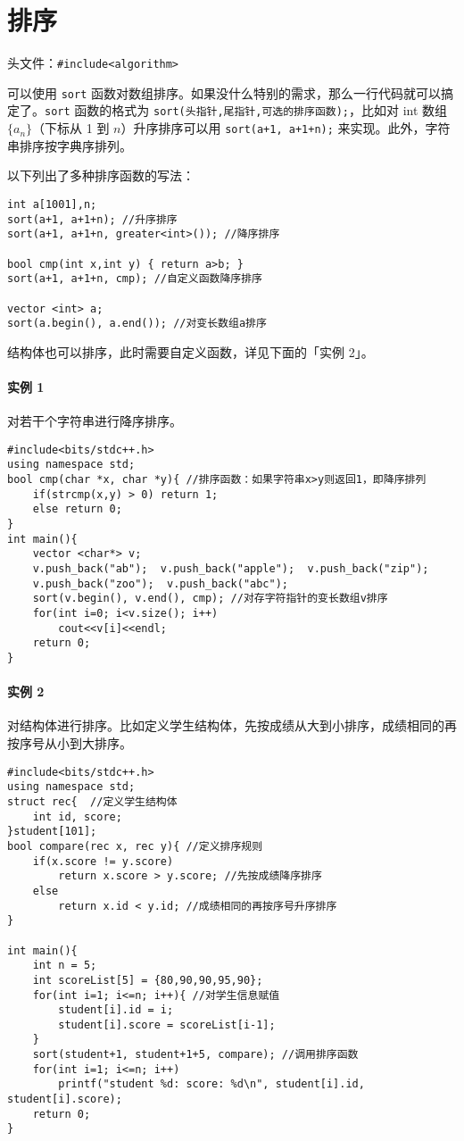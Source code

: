 \documentclass[UTF8]{ctexart}
\begin{document}
\section{排序}
头文件：\verb!#include<algorithm>!

可以使用 \verb!sort! 函数对数组排序。如果没什么特别的需求，那么一行代码就可以搞定了。\verb!sort! 函数的格式为 \verb!sort(头指针,尾指针,可选的排序函数);!，比如对 int 数组 $\{a_n\}$（下标从 1 到 $n$）升序排序可以用 \verb!sort(a+1, a+1+n);! 来实现。此外，字符串排序按字典序排列。

以下列出了多种排序函数的写法：
\begin{lstlisting}[numbers=none]
int a[1001],n;
sort(a+1, a+1+n); //升序排序
sort(a+1, a+1+n, greater<int>()); //降序排序

bool cmp(int x,int y) { return a>b; }
sort(a+1, a+1+n, cmp); //自定义函数降序排序

vector <int> a;
sort(a.begin(), a.end()); //对变长数组a排序
\end{lstlisting}

结构体也可以排序，此时需要自定义函数，详见下面的「实例 2」。

\paragraph{实例 1} 对若干个字符串进行降序排序。
\begin{lstlisting}
#include<bits/stdc++.h>
using namespace std;
bool cmp(char *x, char *y){ //排序函数：如果字符串x>y则返回1，即降序排列
	if(strcmp(x,y) > 0) return 1;
	else return 0;
}
int main(){
	vector <char*> v;
	v.push_back("ab");  v.push_back("apple");  v.push_back("zip");
	v.push_back("zoo");  v.push_back("abc");
	sort(v.begin(), v.end(), cmp); //对存字符指针的变长数组v排序
	for(int i=0; i<v.size(); i++)
		cout<<v[i]<<endl;
	return 0;
}
\end{lstlisting}

\BgThispage
\paragraph{实例 2} 对结构体进行排序。比如定义学生结构体，先按成绩从大到小排序，成绩相同的再按序号从小到大排序。
\begin{lstlisting}
#include<bits/stdc++.h>
using namespace std;
struct rec{  //定义学生结构体
    int id, score;
}student[101];
bool compare(rec x, rec y){ //定义排序规则
    if(x.score != y.score)
        return x.score > y.score; //先按成绩降序排序
    else
        return x.id < y.id; //成绩相同的再按序号升序排序
}

int main(){
	int n = 5;
	int scoreList[5] = {80,90,90,95,90};
	for(int i=1; i<=n; i++){ //对学生信息赋值
		student[i].id = i;
		student[i].score = scoreList[i-1];
	}
	sort(student+1, student+1+5, compare); //调用排序函数
	for(int i=1; i<=n; i++)
		printf("student %d: score: %d\n", student[i].id, student[i].score);
	return 0;
}
\end{lstlisting}
\end{document}
